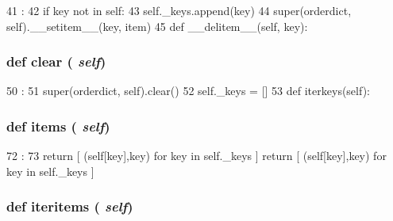 \begin{DoxyCode}
41                                     :
42         if key not in self:
43             self._keys.append(key)
44         super(orderdict, self).__setitem__(key, item)
45 
    def __delitem__(self, key):
\end{DoxyCode}
\hypertarget{classm5_1_1util_1_1orderdict_1_1orderdict_a07b95aa63e9e2d286ef0aa83d5bb34b2}{
\subsubsection[{clear}]{\setlength{\rightskip}{0pt plus 5cm}def clear ( {\em self})}}
\label{classm5_1_1util_1_1orderdict_1_1orderdict_a07b95aa63e9e2d286ef0aa83d5bb34b2}



\begin{DoxyCode}
50                    :
51         super(orderdict, self).clear()
52         self._keys = []
53 
    def iterkeys(self):
\end{DoxyCode}
\hypertarget{classm5_1_1util_1_1orderdict_1_1orderdict_a717291221885735d6870d7179083ec07}{
\subsubsection[{items}]{\setlength{\rightskip}{0pt plus 5cm}def items ( {\em self})}}
\label{classm5_1_1util_1_1orderdict_1_1orderdict_a717291221885735d6870d7179083ec07}



\begin{DoxyCode}
72                    :
73         return [ (self[key],key) for key in self._keys ]
        return [ (self[key],key) for key in self._keys ]
\end{DoxyCode}
\hypertarget{classm5_1_1util_1_1orderdict_1_1orderdict_a13d39839ad1cfd4c47f524735933c0bf}{
\subsubsection[{iteritems}]{\setlength{\rightskip}{0pt plus 5cm}def iteritems ( {\em self})}}
\label{classm5_1_1util_1_1orderdict_1_1orderdict_a13d39839ad1cfd4c47f524735933c0bf}



